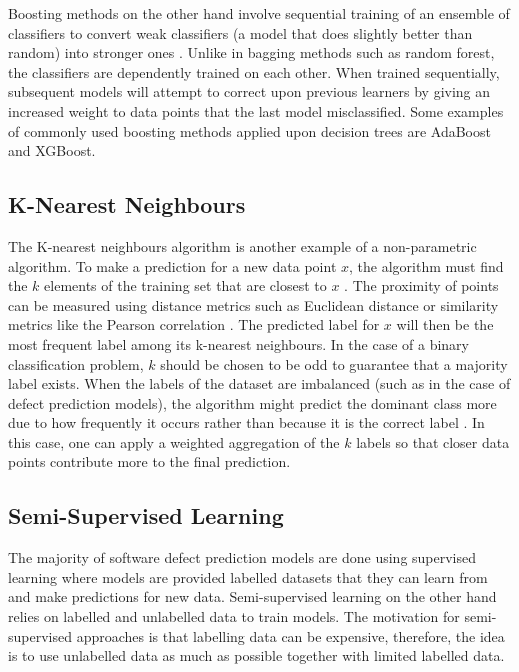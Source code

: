 \documentclass[../main.tex]{subfiles}
\begin{document}
Boosting methods on the other hand involve sequential training of an ensemble of classifiers to convert weak classifiers (a model that does slightly better than random) into stronger ones \cite{sewell2008ensemble}. Unlike in bagging methods such as random forest, the classifiers are dependently trained on each other. When trained sequentially, subsequent models will attempt to correct upon previous learners by giving an increased weight to data points that the last model misclassified. Some examples of commonly used boosting methods applied upon decision trees are AdaBoost and XGBoost. 

\subsection{K-Nearest Neighbours}

The K-nearest neighbours algorithm is another example of a non-parametric algorithm. To make a prediction for a new data point $x$, the algorithm must find the $k$ elements of the training set that are closest to $x$ \cite{cunningham2007k}. The proximity of points can be measured using distance metrics such as Euclidean distance or similarity metrics like the Pearson correlation \cite{jaskowiak2011comparing}. The predicted label for $x$ will then be the most frequent label among its k-nearest neighbours. In the case of a binary classification problem, $k$ should be chosen to be odd to guarantee that a majority label exists. When the labels of the dataset are imbalanced (such as in the case of defect prediction models), the algorithm might predict the dominant class more due to how frequently it occurs rather than because it is the correct label \cite{coomans1982alternative}. In this case, one can apply a weighted aggregation of the $k$ labels so that closer data points contribute more to the final prediction.  


\subsection{Semi-Supervised Learning}

The majority of software defect prediction models are done using supervised learning where models are provided labelled datasets that they can learn from and make predictions for new data. Semi-supervised learning on the other hand relies on labelled and unlabelled data to train models. The motivation for semi-supervised approaches is that labelling data can be expensive, therefore, the idea is to use unlabelled data as much as possible together with limited labelled data. 
\end{document}
